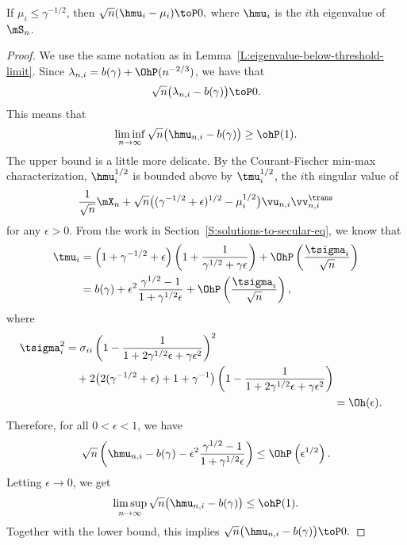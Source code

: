 \begin{lemma}
    If $\mu_i \leq \gamma^{-1/2}$, then
    \(
        \sqrt{n} ( \hmu_i - \mu_i ) \toP 0,
    \)
    where $\hmu_i$ is the $i$th eigenvalue of $\mS_n$.
\end{lemma}
\begin{proof}
We use the same notation as in Lemma~\ref{L:eigenvalue-below-threshold-limit}.
Since $\lambda_{n,i} = b(\gamma) + \OhP(n^{-2/3})$, we have that
\[
    \sqrt{n} \big( \lambda_{n,i} - b(\gamma) \big) \toP 0.
\]
This means that
\[
    \liminf_{n\to\infty} \sqrt{n} \big( \hmu_{n,i} - b(\gamma) \big)
        \geq \ohP(1).
\]
The upper bound is a little more delicate.  By the Courant-Fischer min-max
characterization, $\hmu_i^{1/2}$ is bounded above by $\tmu_i^{1/2}$, the 
$i$th singular value of
\[
    \frac{1}{\sqrt{n}} \mX_n 
    + 
    \sqrt{n} \big( (\gamma^{-1/2} + \epsilon)^{1/2} - \mu_i^{1/2} \big)
    \vu_{n,i} \vv_{n,i}^\trans
\]
for any $\epsilon > 0$.  From the work in  Section~\ref{S:solutions-to-secular-eq}, we know that
\begin{align*}
    \tmu_i
        &=
            \left(
                1 + \gamma^{-1/2} + \epsilon
            \right)
            \left(
                1
                +
                \frac{ 1 }
                     { \gamma^{1/2} + \gamma \epsilon }
            \right)
            +
            \OhP \left(
                \frac{\tsigma_i}{ \sqrt{n} }
            \right) \\
        &=
            b(\gamma)
            +
            \epsilon^2
            \frac{ \gamma^{1/2} - 1 }{ 1 + \gamma^{1/2} \epsilon }
            +
            \OhP \left(
                \frac{\tsigma_i}{ \sqrt{n} }
            \right),
\end{align*}
where
\begin{align*}
    \begin{split}
    \tsigma_i^2
    &=
    \sigma_{ii}
    \left(
        1 - \frac{1}{1 + 2 \gamma^{1/2} \epsilon + \gamma \epsilon^2}
    \right)^2 \\
    &\quad+
    2\big( 2 (\gamma^{-1/2} + \epsilon)  + 1 + \gamma^{-1} \big)
    \left(
        1 - \frac{1}{1 + 2 \gamma^{1/2} \epsilon + \gamma \epsilon^2}    
    \right)
    \end{split} \\
    &= \Oh( \epsilon ).
\end{align*}
Therefore, for all $0 < \epsilon < 1$, we have
\[
    \sqrt{n}
    \left(
        \hmu_{n,i}
        - 
        b(\gamma) 
        - \epsilon^2
        \frac{ \gamma^{1/2} - 1 }{ 1 + \gamma^{1/2} \epsilon }
    \right)
    \leq
    \OhP \left( \epsilon^{1/2} \right).
\]
Letting $\epsilon \to 0$, we get
\[
    \limsup_{n\to\infty} 
        \sqrt{n}
        \big(
            \hmu_{n,i}
            -
            b(\gamma)
        \big)
        \leq
        \ohP(1).
\]
Together with the lower bound, this implies
\(
    \sqrt{n}
    \big(
        \hmu_{n,i}
        -
        b(\gamma)
    \big)
    \toP
    0.
\)
\end{proof}

